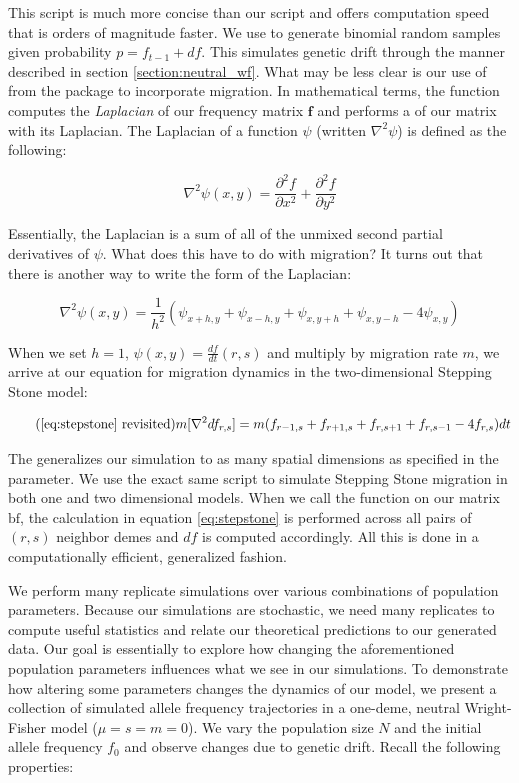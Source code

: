 This script is much more concise than our  script and offers computation speed that is orders of magnitude faster. We use  to generate binomial random samples given probability $p = f_{t-1} + df$. This simulates genetic drift through the manner described in section  \ref{section:neutral_wf}. What may be less clear is our use of  from the  package \cite{scipy} to incorporate migration. In mathematical terms, the  function computes the \textit{Laplacian} of our frequency matrix $\textbf{f}$ and performs a  of our matrix with its Laplacian. The Laplacian of a function $\psi$ (written $\nabla^2 \psi$) is defined as the following:

\begin{equation}
    \nabla^2 \psi(x,y) =  \frac{\partial^2 f}{\partial x^2} + \frac{\partial^2 f}{\partial y^2}
\end{equation}

Essentially, the Laplacian is a sum of all of the unmixed second partial derivatives of $\psi$. What does this have to do with migration? It turns out that there is another way to write the form of the Laplacian:

\begin{equation}
    \nabla^2 \psi(x,y) =  \frac{1}{h^2}(\psi_{x+h,y} + \psi_{x-h,y} + \psi_{x,y+h} + \psi_{x,y-h} - 4\psi_{x,y})
\end{equation}

When we set $h = 1$, $\psi(x,y) = \frac{df}{dt}(r,s)$ and multiply by migration rate $m$, we arrive at our equation for migration dynamics in the two-dimensional Stepping Stone model:

\begin{equation} 
    \tag{\ref{eq:stepstone} revisited}
    m[\nabla^2 df_{r,s}] = m(f_{r-1,s} + f_{r+1,s} + f_{r,s+1} + f_{r,s-1} - 4f_{r,s})dt
\end{equation}


The  generalizes our simulation to as many spatial dimensions as specified in the  parameter. We use the exact same script to simulate Stepping Stone migration in both one and two dimensional models. When we call the  function on our matrix $\text{bf}$, the calculation in equation \ref{eq:stepstone} is performed across all pairs of $(r,s)$ neighbor demes and $df$ is computed accordingly. All this is done in a computationally efficient, generalized fashion.


We perform many replicate simulations over various combinations of population parameters. Because our simulations are stochastic, we need many replicates to compute useful statistics and relate our theoretical predictions to our generated data. Our goal is essentially to explore how changing the aforementioned population parameters influences what we see in our simulations. To demonstrate how altering some parameters changes the dynamics of our model, we present a collection of simulated allele frequency trajectories in a one-deme, neutral Wright-Fisher model ($\mu = s = m = 0$). We vary the population size $N$ and the initial allele frequency $f_0$ and observe changes due to genetic drift. Recall the following properties:


